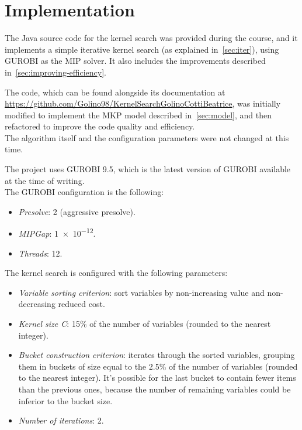 \chapter{Implementation}\label{ch:implementation}
The Java source code for the kernel search was provided during the course,
and it implements a simple iterative kernel search (as explained in~\ref{sec:iter}),
using GUROBI as the MIP solver.
It also includes the improvements described in~\ref{sec:improving-efficiency}.

The code, which can be found alongside its documentation at
\url{https://github.com/Golino98/KernelSearchGolinoCottiBeatrice},
was initially modified to implement the MKP model described in~\ref{sec:model},
and then refactored to improve the code quality and efficiency.\\
The algorithm itself and the configuration parameters were not changed at this time.

The project uses GUROBI 9.5, which is the latest version of GUROBI available at the time of writing.\\
The GUROBI configuration is the following:
\begin{itemize}
    \item \textit{Presolve}: 2 (aggressive presolve).
    \item \textit{MIPGap}: \num{1e-12}.
    \item \textit{Threads}: 12.
\end{itemize}

The kernel search is configured with the following parameters:
\begin{itemize}
    \item \textit{Variable sorting criterion}: sort variables by non-increasing value and non-decreasing reduced cost.
    \item \textit{Kernel size C}: 15\% of the number of variables (rounded to the nearest integer).
    \item \textit{Bucket construction criterion}: iterates through the sorted variables, grouping them in
    buckets of size equal to the 2.5\% of the number of variables (rounded to the nearest integer).
    It's possible for the last bucket to contain fewer items than the previous ones, because the number
    of remaining variables could be inferior to the bucket size.
    \item \textit{Number of iterations}: 2.
\end{itemize}

